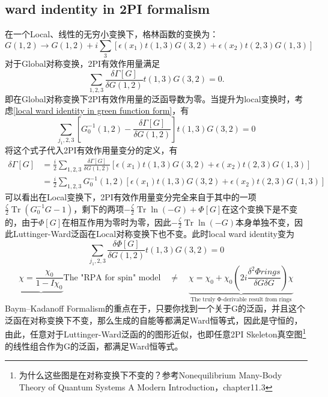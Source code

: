 \documentclass[10pt,openany]{book}
\theoremstyle{thmstyle} %
\theoremstyle{defstyle} %
\theoremstyle{prostyle} %
\begin{document}
\subsection{ward indentity in 2PI formalism}
在一个Local、线性的无穷小变换下，格林函数的变换为：
\begin{equation*}
  G(1,2) \rightarrow G(1,2)+i \sum_3\left[\epsilon\left(x_1\right) t(1,3) G(3,2)+\epsilon\left(x_2\right) t(2,3) G(1,3)\right]
\end{equation*}
对于Global对称变换，2PI有效作用量满足
\begin{equation*}
  \sum_{1,2,3} \frac{\delta \Gamma[G]}{\delta G(1,2)} t(1,3) G(3,2)=0 .
\end{equation*}
即在Global对称变换下2PI有效作用量的泛函导数为零。当提升为local变换时，考虑\eqref{local ward identity in green function form}，有
\begin{equation}
  \sum_{j_1, 2,3}\left[G_0^{-1}(1,2)-\frac{\delta \Gamma[G]}{\delta G(1,2)}\right] t(1,3) G(3,2)=0
\end{equation}
将这个式子代入2PI有效作用量变分的定义，有
\begin{equation}
  \begin{aligned}
\delta \Gamma[G] & =\frac{i}{2} \sum_{1,2,3} \frac{\delta \Gamma[G]}{\delta G(1,2)}\left[\epsilon\left(x_1\right) t(1,3) G(3,2)+\epsilon\left(x_2\right) t(2,3) G(1,3)\right] \\
& =\frac{i}{2} \sum_{1,2,3} G_0^{-1}(1,2)\left[\epsilon\left(x_1\right) t(1,3) G(3,2)+\epsilon\left(x_2\right) t(2,3) G(1,3)\right]
\end{aligned}
\end{equation}
可以看出在Local变换下，2PI有效作用量变分完全来自于其中的一项$ \frac{\zeta}{2} \operatorname{Tr}\left(G_0^{-1} G-1\right) $，剩下的两项$ -\frac{\zeta}{2} \operatorname{Tr} \ln (-G)+\Phi[G] $在这个变换下是不变的，由于$ \Phi[G] $在相互作用为零时为零，因此$ -\frac{\zeta}{2} \operatorname{Tr} \ln (-G) $本身单独不变，因此Luttinger-Ward泛函在Local对称变换下也不变。此时local ward identity变为
\begin{equation}
  \sum_{j_1, 2,3} \frac{\delta \Phi[G]}{\delta G(1,2)} t(1,3) G(3,2)=0
\end{equation}
$$ \underbrace{\chi = \frac{\chi_0}{1 - I\chi_0}}{\text{The "RPA for spin" model}} \quad \neq \quad \underbrace{\chi = \chi_0 + \chi_0 \left( 2i \frac{\delta^2 \Phi{rings}}{\delta G \delta G} \right) \chi}_{\text{The truly Φ-derivable result from rings}}$$
Baym–Kadanoff Formalism的重点在于，只要你找到一个关于G的泛函，并且这个泛函在对称变换下不变，那么生成的自能等都满足Ward恒等式，因此是守恒的，由此，任意对于Luttinger-Ward泛函的的图形近似，也即任意2PI Skeleton真空图\footnote{为什么这些图是在对称变换下不变的？参考Nonequilibrium Many-Body Theory of Quantum Systems A Modern Introduction，chapter11.3}的线性组合作为G的泛函，都满足Ward恒等式。\\
\end{document}
